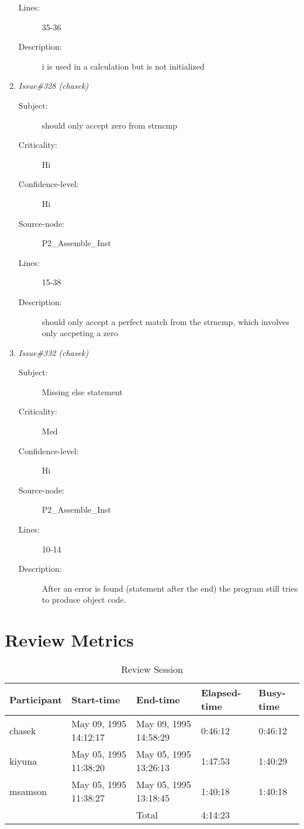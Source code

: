 \begin{enumerate}
\begin{description}
\item [Lines:] 35-36

\item [Description:] i is used in a calculation but is not initialized
\end{description}
\item {\it Issue\#328 (chasek)}
\begin{description}
\item [Subject:] should only accept zero from strncmp
\item [Criticality:] Hi
\item [Confidence-level:] Hi
\item [Source-node:] P2\_Assemble\_Inst

\item [Lines:] 15-38

\item [Description:] should only accept a perfect match from the
strncmp, which involves only accpeting a zero
\end{description}
\item {\it Issue\#332 (chasek)}
\begin{description}
\item [Subject:] Missing else statement
\item [Criticality:] Med
\item [Confidence-level:] Hi
\item [Source-node:] P2\_Assemble\_Inst

\item [Lines:] 10-14

\item [Description:] After an error is found (statement after the
end) the program still tries to produce object code.
\end{description}
\end{enumerate}
\section{Review Metrics}
\begin{table}[hb]
\begin{center}
\begin{tabular}{|l|l|l|l|l|}
\hline
Participant & Start-time & End-time & Elapsed-time & Busy-time \\
\hline
chasek & May 09, 1995 14:12:17 & May 09, 1995 14:58:29 & 0:46:12 & 0:46:12 \\
kiyuna & May 05, 1995 11:38:20 & May 05, 1995 13:26:13 & 1:47:53 & 1:40:29 \\
msamson & May 05, 1995 11:38:27 & May 05, 1995 13:18:45 & 1:40:18 & 1:40:18 \\
\hline
 & & Total & 4:14:23 & \\
\hline
\end{tabular}
\end{center}
\caption{Review Session}
\end{table}


